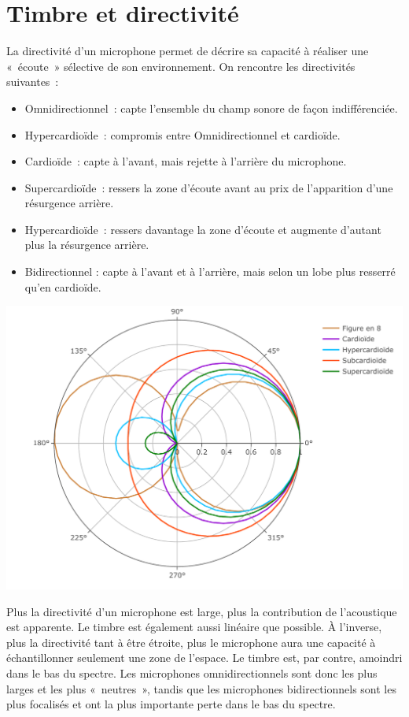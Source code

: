 \documentclass[
]{book}
\providecommand{\tightlist}{%
  \setlength{\itemsep}{0pt}\setlength{\parskip}{0pt}}
\begin{document}
\hypertarget{timbre-et-directivituxe9}{%
\section{Timbre et directivité}\label{timbre-et-directivituxe9}}

La directivité d'un microphone permet de décrire sa capacité à réaliser une «~écoute~» sélective de son environnement. On rencontre les directivités suivantes~:

\begin{itemize}
\tightlist
\item
  Omnidirectionnel~: capte l'ensemble du champ sonore de façon indifférenciée.
\item
  Hypercardioïde~: compromis entre Omnidirectionnel et cardioïde.
\item
  Cardioïde~: capte à l'avant, mais rejette à l'arrière du microphone.
\item
  Supercardioïde~: ressers la zone d'écoute avant au prix de l'apparition d'une résurgence arrière.
\item
  Hypercardioïde~: ressers davantage la zone d'écoute et augmente d'autant plus la résurgence arrière.
\item
  Bidirectionnel : capte à l'avant et à l'arrière, mais selon un lobe plus resserré qu'en cardioïde.
\end{itemize}

\begin{center}\includegraphics{_resources/plotly/test} \end{center}

Plus la directivité d'un microphone est large, plus la contribution de l'acoustique est apparente. Le timbre est également aussi linéaire que possible. À l'inverse, plus la directivité tant à être étroite, plus le microphone aura une capacité à échantillonner seulement une zone de l'espace. Le timbre est, par contre, amoindri dans le bas du spectre. Les microphones omnidirectionnels sont donc les plus larges et les plus «~neutres~», tandis que les microphones bidirectionnels sont les plus focalisés et ont la plus importante perte dans le bas du spectre.
\end{document}
